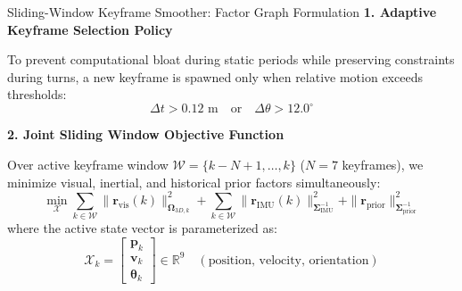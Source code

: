 \documentclass[aspectratio=169, 10pt]{beamer}
\begin{document}
\begin{frame}{Sliding-Window Keyframe Smoother: Factor Graph Formulation}
  {\normalsize \textbf{\textcolor{NavyBlue}{1. Adaptive Keyframe Selection Policy}}}
  \vspace{0.1cm}

  To prevent computational bloat during static periods while preserving constraints during turns, a new keyframe is spawned only when relative motion exceeds thresholds:
  \begin{equation}
    \Delta t > 0.12\text{ m} \quad \text{or} \quad \Delta \theta > 12.0^\circ
  \end{equation}

  \vspace{0.25cm}
  {\normalsize \textbf{\textcolor{NavyBlue}{2. Joint Sliding Window Objective Function}}}
  \vspace{0.1cm}

  Over active keyframe window $\mathcal{W} = \{k-N+1, \dots, k\}$ ($N=7$ keyframes), we minimize visual, inertial, and historical prior factors simultaneously:
  \begin{equation}
    \min_{\mathcal{X}} \sum_{k \in \mathcal{W}} \|\mathbf{r}_{\text{vis}}(k)\|_{\mathbf{\Omega}_{3D,k}}^2 + \sum_{k \in \mathcal{W}} \|\mathbf{r}_{\text{IMU}}(k)\|_{\mathbf{\Sigma}_{\text{IMU}}^{-1}}^2 + \|\mathbf{r}_{\text{prior}}\|_{\mathbf{\Sigma}_{\text{prior}}^{-1}}^2
  \end{equation}
  where the active state vector is parameterized as:
  \begin{equation}
    \mathcal{X}_k = \begin{bmatrix} \mathbf{p}_k \\ \mathbf{v}_k \\ \boldsymbol{\theta}_k \end{bmatrix} \in \mathbb{R}^9 \quad (\text{position, velocity, orientation})
  \end{equation}
\end{frame}
\end{document}
